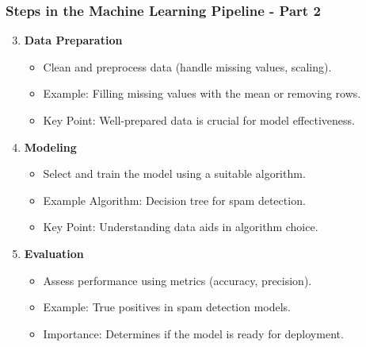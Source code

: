 \documentclass[aspectratio=169]{beamer}
\begin{document}
\begin{frame}[fragile]
    \frametitle{Steps in the Machine Learning Pipeline - Part 2}
    \begin{enumerate}
        \setcounter{enumi}{2} %
        \item \textbf{Data Preparation}
        \begin{itemize}
            \item Clean and preprocess data (handle missing values, scaling).
            \item Example: Filling missing values with the mean or removing rows.
            \item Key Point: Well-prepared data is crucial for model effectiveness.
        \end{itemize}
        
        \item \textbf{Modeling}
        \begin{itemize}
            \item Select and train the model using a suitable algorithm.
            \item Example Algorithm: Decision tree for spam detection.
            \item Key Point: Understanding data aids in algorithm choice.
        \end{itemize}
        
        \item \textbf{Evaluation}
        \begin{itemize}
            \item Assess performance using metrics (accuracy, precision).
            \item Example: True positives in spam detection models.
            \item Importance: Determines if the model is ready for deployment.
        \end{itemize}
    \end{enumerate}
\end{frame}
\end{document}
